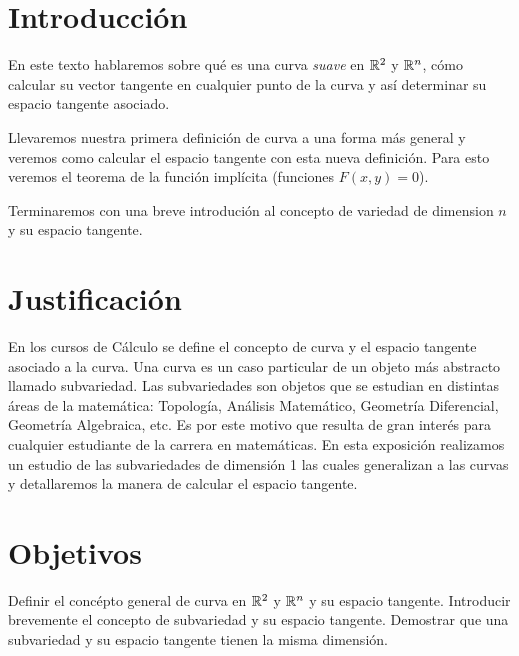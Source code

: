 \section{Introducción}
En este texto hablaremos sobre qué es una curva \emph{suave} en $\mathbb{R}^{2}$ y $\mathbb{R}^{n}$, cómo calcular su vector tangente en cualquier punto de la curva y así determinar
su espacio tangente asociado.

Llevaremos nuestra primera definición de curva a una forma más general y veremos como calcular el espacio tangente con esta nueva definición. Para esto veremos el teorema
de la función implícita (funciones $F(x,y)=0$).

Terminaremos con una breve introdución al concepto de variedad de dimension $n$ y su espacio tangente.
\section{Justificación}
En los cursos de Cálculo se define el concepto de curva y el espacio tangente asociado a la curva. Una curva es un caso particular de un objeto más abstracto llamado subvariedad. Las subvariedades son objetos que se estudian en distintas áreas de la matemática: Topología, Análisis Matemático, Geometría Diferencial, Geometría Algebraica, etc. Es por este motivo que resulta de gran interés para cualquier estudiante de la carrera en matemáticas. En esta exposición realizamos un estudio de las subvariedades de dimensión 1 las cuales generalizan a las curvas y detallaremos la manera de calcular el espacio tangente.

\section{Objetivos}
Definir el concépto general de curva en $\mathbb{R}^{2}$ y $\mathbb{R}^{n}$ y su espacio tangente. Introducir brevemente el concepto de subvariedad y su espacio tangente. Demostrar que una subvariedad y su espacio tangente tienen la misma dimensi\'on.

